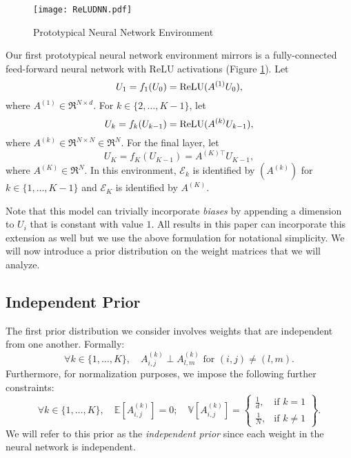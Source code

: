 \documentclass[twoside,11pt]{article}
\def\environment{\mathcal{E}}
\def\var{\mathbb{V}}
\def\relu{{\rm ReLU}}
\def\E{\mathbb{E}}
\begin{document}
\begin{figure}[!ht]
    \centering
    \texttt{[image: ReLUDNN.pdf]}
    \caption{Prototypical Neural Network Environment}
    \label{fig:proto_env1}
\end{figure}

Our first prototypical neural network environment mirrors is a fully-connected feed-forward neural network with ReLU activations (Figure \ref{fig:proto_env1}). Let
$$U_1 = f_1(U_0) = \relu(A^{(1)}U_0),$$
where $A^{(1)}\in\Re^{N\times d}$.
For $k \in\{2, \hdots, K-1\}$, let
$$U_{k} = f_k(U_{k-1}) = \relu(A^{(k)}U_{k-1}),$$
where $A^{(k)} \in \Re^{N\times N}\in\Re^N$. For the final layer, let
$$U_K = f_K(U_{K-1}) = A^{(K)\top} U_{K-1},$$
where $A^{(K)}\in\Re^{N}$. In this environment, $\environment_k$ is identified by $(A^{(k)})$ for $k \in \{1, \hdots, K-1\}$ and $\environment_K$ is identified by $A^{(K)}$.

Note that this model can trivially incorporate \emph{biases} by appending a dimension to $U_{i}$ that is constant with value $1$. All results in this paper can incorporate this extension as well but we use the above formulation for notational simplicity. We will now introduce a prior distribution on the weight matrices that we will analyze.

\subsection{Independent Prior}
\label{subsec:independent-prior}
The first prior distribution we consider involves weights that are independent from one another. Formally:
$$\forall k \in \{1, \ldots, K\},\quad A^{(k)}_{i,j} \perp A^{(k)}_{l,m} \text{ for } (i,j) \neq (l,m).$$
Furthermore, for normalization purposes, we impose the following further constraints:
$$\forall k \in \{1, \ldots, K\},\quad \E\left[A_{i,j}^{(k)}\right] = 0;\quad \var\left[A_{i,j}^{(k)}\right] =
\left\{
    \begin{array}{lr}
        \frac{1}{d}, & \text{if } k = 1\\
        \frac{1}{N}, & \text{if } k \neq 1
    \end{array}
\right\}.$$
We will refer to this prior as the \emph{independent prior} since each weight in the neural network is independent.
\end{document}
